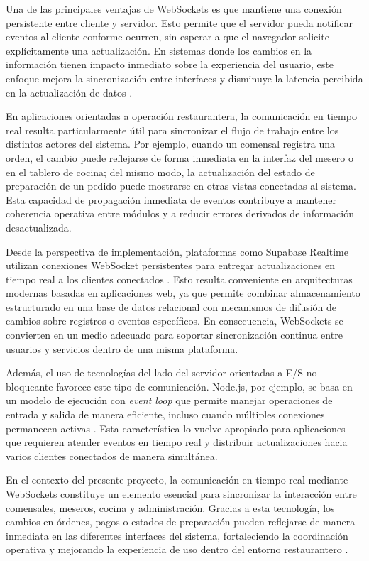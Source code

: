 \documentclass[12pt]{report}
\begin{document}
Una de las principales ventajas de WebSockets es que mantiene una conexión persistente entre cliente y servidor. Esto permite que el servidor pueda notificar eventos al cliente conforme ocurren, sin esperar a que el navegador solicite explícitamente una actualización. En sistemas donde los cambios en la información tienen impacto inmediato sobre la experiencia del usuario, este enfoque mejora la sincronización entre interfaces y disminuye la latencia percibida en la actualización de datos \cite{mdn_websockets_api_2025,mdn_websocket_interface_2024}.

En aplicaciones orientadas a operación restaurantera, la comunicación en tiempo real resulta particularmente útil para sincronizar el flujo de trabajo entre los distintos actores del sistema. Por ejemplo, cuando un comensal registra una orden, el cambio puede reflejarse de forma inmediata en la interfaz del mesero o en el tablero de cocina; del mismo modo, la actualización del estado de preparación de un pedido puede mostrarse en otras vistas conectadas al sistema. Esta capacidad de propagación inmediata de eventos contribuye a mantener coherencia operativa entre módulos y a reducir errores derivados de información desactualizada.

Desde la perspectiva de implementación, plataformas como Supabase Realtime utilizan conexiones WebSocket persistentes para entregar actualizaciones en tiempo real a los clientes conectados \cite{supabase_realtime_background_2026}. Esto resulta conveniente en arquitecturas modernas basadas en aplicaciones web, ya que permite combinar almacenamiento estructurado en una base de datos relacional con mecanismos de difusión de cambios sobre registros o eventos específicos. En consecuencia, WebSockets se convierten en un medio adecuado para soportar sincronización continua entre usuarios y servicios dentro de una misma plataforma.

Además, el uso de tecnologías del lado del servidor orientadas a E/S no bloqueante favorece este tipo de comunicación. Node.js, por ejemplo, se basa en un modelo de ejecución con \textit{event loop} que permite manejar operaciones de entrada y salida de manera eficiente, incluso cuando múltiples conexiones permanecen activas \cite{node_event_loop_2025,node_streams_event_driven_2025}. Esta característica lo vuelve apropiado para aplicaciones que requieren atender eventos en tiempo real y distribuir actualizaciones hacia varios clientes conectados de manera simultánea.

En el contexto del presente proyecto, la comunicación en tiempo real mediante WebSockets constituye un elemento esencial para sincronizar la interacción entre comensales, meseros, cocina y administración. Gracias a esta tecnología, los cambios en órdenes, pagos o estados de preparación pueden reflejarse de manera inmediata en las diferentes interfaces del sistema, fortaleciendo la coordinación operativa y mejorando la experiencia de uso dentro del entorno restaurantero \cite{mdn_websockets_api_2025,rfc6455_2011,supabase_realtime_background_2026}.
\end{document}
